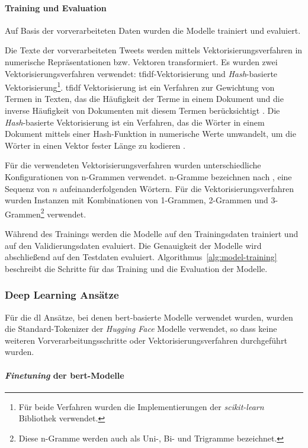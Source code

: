 \paragraph{Training und Evaluation}
Auf Basis der vorverarbeiteten Daten wurden die Modelle trainiert und evaluiert.

Die Texte der vorverarbeiteten Tweets werden mittels Vektorisierungsverfahren in numerische Repräsentationen bzw. Vektoren transformiert.
Es wurden zwei Vekto\-risierungs\-verfahren verwendet: \gls{tfidf}-Vek\-to\-ri\-sie\-rung und \textit{Hash}-basierte Vektorisierung\footnote{Für beide Verfahren wurden die Implementierungen der \textit{scikit-learn} Bibliothek verwendet.}.
\gls{tfidf} Vektorisierung ist ein Verfahren zur Gewichtung von Termen in Texten, das die Häufigkeit der Terme in einem Dokument und die inverse Häufigkeit von Dokumenten mit diesem Termen berücksichtigt \cite[S. 119]{manning2009introduction}.
Die \textit{Hash}-basierte Vektorisierung ist ein Verfahren, das die Wörter in einem Dokument mittels einer Hash-Funktion in numerische Werte umwandelt, um die Wörter in einen Vektor fester Länge zu kodieren \cite{sklearnextraction2025}.

Für die verwendeten Vektorisierungsverfahren wurden unterschiedliche Konfigurationen von n-Grammen verwendet.
n-Gramme bezeichnen nach \cite[S.33]{jm3}, eine Sequenz von $n$ aufeinanderfolgenden Wörtern.
Für die Vektorisierungsverfahren wurden Instanzen mit Kombinationen von 1-Grammen, 2-Grammen und 3-Grammen\footnote{Diese n-Gramme werden auch als Uni-, Bi- und Trigramme bezeichnet.} verwendet.

Während des Trainings werden die Modelle auf den Trainingsdaten trainiert und auf den Validierungsdaten evaluiert.
Die Genauigkeit der Modelle wird abschließend auf den Testdaten evaluiert.
Algorithmus~\ref{alg:model-training} beschreibt die Schritte für das Training und die Evaluation der Modelle.

\subsubsection{Deep Learning Ansätze} \label{subsubsec:experimente-deep-learning-ansaetze}

Für die \gls{dl} Ansätze, bei denen \gls{bert}-basierte Modelle verwendet wurden, wurden die Standard-Tokenizer der \textit{Hugging Face} Modelle verwendet, so dass keine weiteren Vorverarbeitungsschritte oder Vektorisierungsverfahren durchgeführt wurden.

\paragraph{\textit{Finetuning} der \gls{bert}-Modelle}

